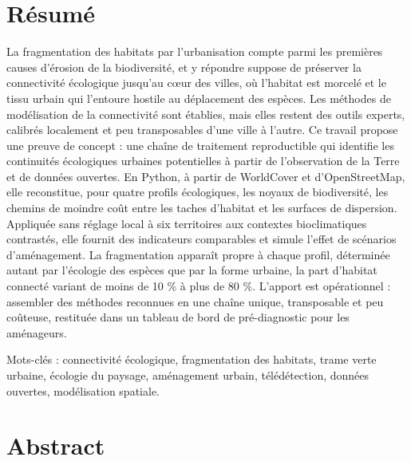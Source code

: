 \documentclass[a4paper,12pt]{report}
\begin{document}
\section*{Résumé}

La fragmentation des habitats par l'urbanisation compte parmi les premières causes d'érosion de la biodiversité, et y répondre suppose de préserver la connectivité écologique jusqu'au cœur des villes, où l'habitat est morcelé et le tissu urbain qui l'entoure hostile au déplacement des espèces. Les méthodes de modélisation de la connectivité sont établies, mais elles restent des outils experts, calibrés localement et peu transposables d'une ville à l'autre. Ce travail propose une preuve de concept : une chaîne de traitement reproductible qui identifie les continuités écologiques urbaines potentielles à partir de l'observation de la Terre et de données ouvertes. En Python, à partir de WorldCover et d'OpenStreetMap, elle reconstitue, pour quatre profils écologiques, les noyaux de biodiversité, les chemins de moindre coût entre les taches d'habitat et les surfaces de dispersion. Appliquée sans réglage local à six territoires aux contextes bioclimatiques contrastés, elle fournit des indicateurs comparables et simule l'effet de scénarios d'aménagement. La fragmentation apparaît propre à chaque profil, déterminée autant par l'écologie des espèces que par la forme urbaine, la part d'habitat connecté variant de moins de 10 \% à plus de 80 \%. L'apport est opérationnel : assembler des méthodes reconnues en une chaîne unique, transposable et peu coûteuse, restituée dans un tableau de bord de pré-diagnostic pour les aménageurs.

Mots-clés : connectivité écologique, fragmentation des habitats, trame verte urbaine, écologie du paysage, aménagement urbain, télédétection, données ouvertes, modélisation spatiale.

\section*{Abstract}
\end{document}
